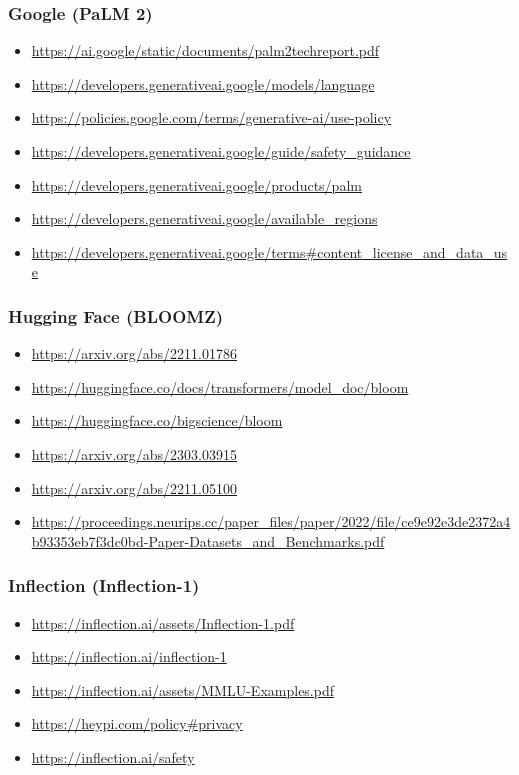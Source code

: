 \subsubsection{Google (PaLM 2)}
\begin{itemize}
\item \url{https://ai.google/static/documents/palm2techreport.pdf}
\item \url{https://developers.generativeai.google/models/language}
\item \url{https://policies.google.com/terms/generative-ai/use-policy}
\item \url{https://developers.generativeai.google/guide/safety_guidance}
\item \url{https://developers.generativeai.google/products/palm}
\item \url{https://developers.generativeai.google/available_regions}
\item \url{https://developers.generativeai.google/terms#content_license_and_data_use}
\end{itemize}

\subsubsection{Hugging Face (BLOOMZ)}
\begin{itemize}
\item \url{https://arxiv.org/abs/2211.01786}
\item \url{https://huggingface.co/docs/transformers/model_doc/bloom}
\item \url{https://huggingface.co/bigscience/bloom}
\item \url{https://arxiv.org/abs/2303.03915}
\item \url{https://arxiv.org/abs/2211.05100}
\item \url{https://proceedings.neurips.cc/paper_files/paper/2022/file/ce9e92e3de2372a4b93353eb7f3dc0bd-Paper-Datasets_and_Benchmarks.pdf}
\end{itemize}

\subsubsection{Inflection (Inflection-1)}
\begin{itemize}
\item \url{https://inflection.ai/assets/Inflection-1.pdf}
\item \url{https://inflection.ai/inflection-1}
\item \url{https://inflection.ai/assets/MMLU-Examples.pdf}
\item \url{https://heypi.com/policy#privacy}
\item \url{https://inflection.ai/safety}
\end{itemize}

